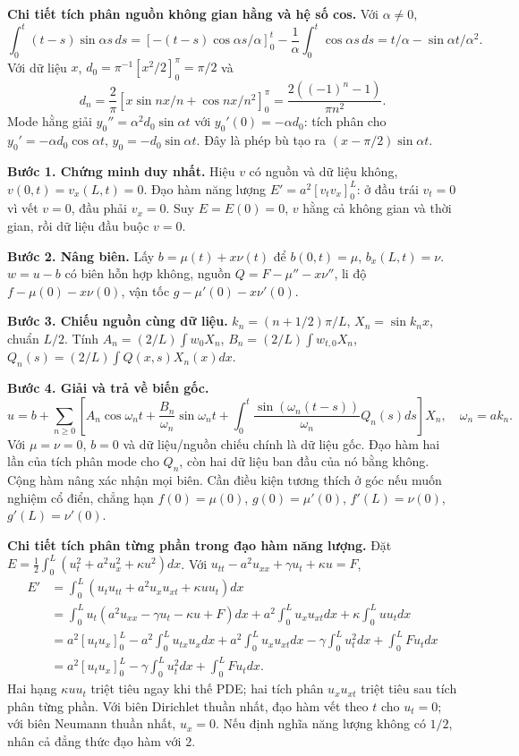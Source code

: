 \textbf{Chi tiết tích phân nguồn không gian hằng và hệ số cos.} Với $\alpha\ne0$,
\[\int_0^t(t-s)\sin\alpha s\,ds
=\left[-(t-s)\cos\alpha s/\alpha\right]_0^t-\frac1\alpha\int_0^t\cos\alpha s\,ds
=t/\alpha-\sin\alpha t/\alpha^2.\]
Với dữ liệu $x$, $d_0=\pi^{-1}[x^2/2]_0^\pi=\pi/2$ và
\[d_n=\frac2\pi\left[x\sin nx/n+\cos nx/n^2\right]_0^\pi
=\frac{2((-1)^n-1)}{\pi n^2}.\]
Mode hằng giải $y_0''=\alpha^2d_0\sin\alpha t$ với $y_0'(0)=-\alpha d_0$: tích phân cho $y_0'=-\alpha d_0\cos\alpha t$, $y_0=-d_0\sin\alpha t$. Đây là phép bù tạo ra $(x-\pi/2)\sin\alpha t$.

\textbf{Bước 1. Chứng minh duy nhất.} Hiệu $v$ có nguồn và dữ liệu không, $v(0,t)=v_x(L,t)=0$. Đạo hàm năng lượng $E'=a^2[v_tv_x]_0^L$: ở đầu trái $v_t=0$ vì vết $v=0$, đầu phải $v_x=0$. Suy $E=E(0)=0$, $v$ hằng cả không gian và thời gian, rồi dữ liệu đầu buộc $v=0$.

\textbf{Bước 2. Nâng biên.} Lấy $b=\mu(t)+x\nu(t)$ để $b(0,t)=\mu$, $b_x(L,t)=\nu$. $w=u-b$ có biên hỗn hợp không, nguồn $Q=F-\mu''-x\nu''$, li độ $f-\mu(0)-x\nu(0)$, vận tốc $g-\mu'(0)-x\nu'(0)$.

\textbf{Bước 3. Chiếu nguồn cùng dữ liệu.} $k_n=(n+1/2)\pi/L$, $X_n=\sin k_nx$, chuẩn $L/2$. Tính $A_n=(2/L)\int w_0X_n$, $B_n=(2/L)\int w_{t,0}X_n$, $Q_n(s)=(2/L)\int Q(x,s)X_n(x)dx$.

\textbf{Bước 4. Giải và trả về biến gốc.}
\[u=b+\sum_{n\ge0}\left[A_n\cos\omega_nt+\frac{B_n}{\omega_n}\sin\omega_nt+\int_0^t\frac{\sin(\omega_n(t-s))}{\omega_n}Q_n(s)ds\right]X_n,\quad\omega_n=ak_n.\]
Với $\mu=\nu=0$, $b=0$ và dữ liệu/nguồn chiếu chính là dữ liệu gốc. Đạo hàm hai lần của tích phân mode cho $Q_n$, còn hai dữ liệu ban đầu của nó bằng không. Cộng hàm nâng xác nhận mọi biên. Cần điều kiện tương thích ở góc nếu muốn nghiệm cổ điển, chẳng hạn $f(0)=\mu(0)$, $g(0)=\mu'(0)$, $f'(L)=\nu(0)$, $g'(L)=\nu'(0)$.

\textbf{Chi tiết tích phân từng phần trong đạo hàm năng lượng.} Đặt $E=\frac12\int_0^L(u_t^2+a^2u_x^2+\kappa u^2)dx$. Với $u_{tt}-a^2u_{xx}+\gamma u_t+\kappa u=F$,
\[\begin{aligned}
E'&=\int_0^L(u_tu_{tt}+a^2u_xu_{xt}+\kappa uu_t)dx\\
&=\int_0^Lu_t(a^2u_{xx}-\gamma u_t-\kappa u+F)dx
+a^2\int_0^Lu_xu_{xt}dx+\kappa\int_0^Luu_tdx\\
&=a^2[u_tu_x]_0^L-a^2\int_0^Lu_{tx}u_xdx
+a^2\int_0^Lu_xu_{xt}dx-\gamma\int_0^Lu_t^2dx+\int_0^LFu_tdx\\
&=a^2[u_tu_x]_0^L-\gamma\int_0^Lu_t^2dx+\int_0^LFu_tdx.
\end{aligned}\]
Hai hạng $\kappa uu_t$ triệt tiêu ngay khi thế PDE; hai tích phân $u_xu_{xt}$ triệt tiêu sau tích phân từng phần. Với biên Dirichlet thuần nhất, đạo hàm vết theo $t$ cho $u_t=0$; với biên Neumann thuần nhất, $u_x=0$. Nếu định nghĩa năng lượng không có $1/2$, nhân cả đẳng thức đạo hàm với $2$.

